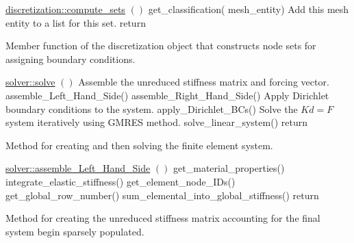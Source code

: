 \documentclass[a4paper, 12pt]{article}
\begin{document}
\vspace{\baselineskip}
\begin{algorithm}
  \underline{discretization::compute\_sets} $()$
  \BlankLine
  {
    {
      get\_classification( mesh\_entity)\;
      {
        \tcc
        {
          Add this mesh entity to a list for this set.
        }
      }
    }
  }
  return\;
  \caption{Member function of the discretization object that constructs
            node sets for assigning boundary conditions.}
  \label{al:compSets}
\end{algorithm}

\vspace{\baselineskip}
\begin{algorithm}[H]
  \underline{solver::solve} $()$
  \BlankLine
  \tcc
  {
    Assemble the unreduced stiffness matrix and forcing vector.
  }
  assemble\_Left\_Hand\_Side()\;
  assemble\_Right\_Hand\_Side()\;
  \tcc
  {
    Apply Dirichlet boundary conditions to the system.
  }
  apply\_Dirichlet\_BCs()\;
  \tcc
  {
    Solve the $Kd=F$ system iteratively using GMRES method.
  }
  solve\_linear\_system()\;
  return\;
  \caption{Method for creating and then solving the finite element system.}
  \label{al:solve}
\end{algorithm}

\vspace{\baselineskip}
\begin{algorithm}[H]
  \underline{solver::assemble\_Left\_Hand\_Side} $()$
  \BlankLine
  get\_material\_properties()\;
  {
    integrate\_elastic\_stiffness()\;
    get\_element\_node\_IDs()\;
    {
      get\_global\_row\_number()\;
      sum\_elemental\_into\_global\_stiffness()\;
    }
  }
  return\;
  \caption{Method for creating the unreduced stiffness matrix accounting
          for the final system begin sparsely populated.}
  \label{al:AssembleLHS}
\end{algorithm}
\end{document}
